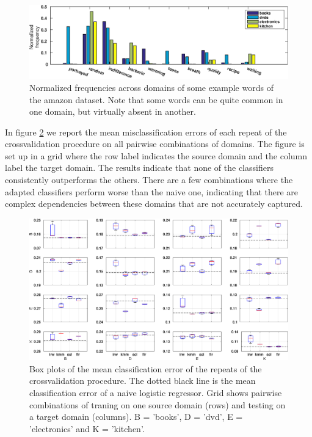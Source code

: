 \documentclass[twoside,11pt]{article}
\begin{document}
\begin{figure}[ht]
\centering
\includegraphics[width=.9\textwidth]{images/eg_amazon.eps}
\caption{Normalized frequencies across domains of some example words of the amazon dataset. Note that some words can be quite common in one domain, but virtually absent in another.}
\label{eg_amazon}
\end{figure}

In figure \ref{err_amazon} we report the mean misclassification errors of each repeat of the crossvalidation procedure on all pairwise combinations of domains. The figure is set up in a grid where the row label indicates the source domain and the column label the target domain. The results indicate that none of the classifiers consistently outperforms the others. There are a few combinations where the adapted classifiers perform worse than the naive one, indicating that there are complex dependencies between these domains that are not accurately captured.

\begin{figure}[ht]
	\centering
	\includegraphics[width=.9\textwidth]{images/err_amazon_box.eps} 	
	\caption{Box plots of the mean classification error of the repeats of the crossvalidation procedure. The dotted black line is the mean classification error of a naive logistic regressor. Grid shows pairwise combinations of traning on one source domain (rows) and testing on a target domain (columns). B = 'books', D = 'dvd', E = 'electronics' and K = 'kitchen'.}
	\label{err_amazon}
\end{figure}
\end{document}

